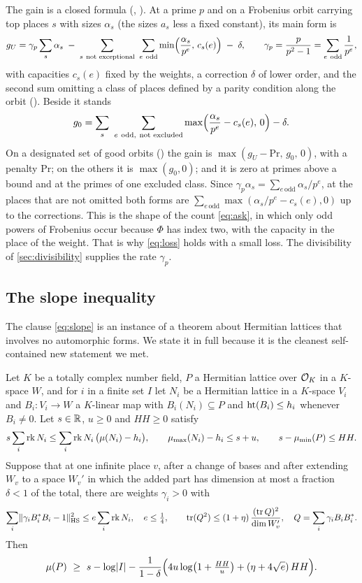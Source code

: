 The gain is a closed formula \lvS{} (, ). At a prime $p$ and on a
Frobenius orbit carrying top places $s$ with sizes $\alpha_s$ (the sizes $a_s$ less a fixed
constant), its main form is
\begin{equation}\label{eq:gU}
g_U=\gamma_p\sum_{s}\alpha_s\;-\;\sum_{s\ \text{not exceptional}}\ \sum_{e\ \mathrm{odd}}
\min\Bigl(\frac{\alpha_s}{p^{e}},\,c_s(e)\Bigr)\;-\;\delta,
\qquad \gamma_p=\frac{p}{p^2-1}=\sum_{e\ \mathrm{odd}}\frac1{p^{e}},
\end{equation}
with capacities $c_s(e)$ fixed by the weights, a correction $\delta$ of lower order, and the
second sum omitting a class of places defined by a parity condition along the orbit
(). Beside it stands
\[
g_0=\sum_{s}\ \sum_{e\ \mathrm{odd},\ \text{not excluded}}\max\Bigl(\frac{\alpha_s}{p^{e}}-c_s(e),\,0\Bigr)-\delta .
\]
On a designated set of good orbits () the gain is
$\max(g_U-\mathrm{Pr},\,g_0,\,0)$, with a penalty $\mathrm{Pr}$; on the others it is
$\max(g_0,0)$; and it is zero at primes above a bound and at the primes of one excluded class.
Since $\gamma_p\alpha_s=\sum_{e\,\mathrm{odd}}\alpha_s/p^e$, at the places that are not omitted
both forms are $\sum_{e\,\mathrm{odd}}\max(\alpha_s/p^e-c_s(e),0)$ up to the corrections. This
is the shape of the count \eqref{eq:ask}, in which only odd powers of Frobenius occur because
$\Phi$ has index two, with the capacity in the place of the weight. That is why
\eqref{eq:loss} holds with a small loss. The divisibility of \cref{sec:divisibility} supplies
the rate $\gamma_p$.

\subsection{The slope inequality}\label{sec:slope}
The clause \eqref{eq:slope} is an instance of a theorem about Hermitian lattices that involves
no automorphic forms. We state it in full because it is the cleanest self-contained new
statement we met.

\begin{statement}\label{st:F}
Let $K$ be a totally complex number field, $P$ a Hermitian lattice over $\mathcal{O}_K$ in a $K$-space
$W$, and for $i$ in a finite set $I$ let $N_i$ be a Hermitian lattice in a $K$-space $V_i$ and
$B_i\colon V_i\to W$ a $K$-linear map with $B_i(N_i)\subseteq P$ and $\operatorname{ht}(B_i)\le h_i$ whenever
$B_i\ne0$. Let $s\in\mathbb{R}$, $u\ge0$ and $HH\ge0$ satisfy
\[
s\sum_i\operatorname{rk} N_i\le\sum_i\operatorname{rk} N_i\,\bigl(\mu(N_i)-h_i\bigr),\qquad
\mu_{\max}(N_i)-h_i\le s+u,\qquad s-\mu_{\min}(P)\le HH .
\]
Suppose that at one infinite place $v$, after a change of bases and after extending $W_v$ to a
space $W_v'$ in which the added part has dimension at most a fraction $\delta<1$ of the total,
there are weights $\gamma_i>0$
with
\[
\sum_i\lVert \gamma_iB_i^*B_i-1\rVert_{\mathrm{HS}}^2\le e\sum_i\operatorname{rk} N_i,\quad e\le\tfrac14,
\qquad
\operatorname{tr}(Q^2)\le(1+\eta)\,\frac{(\operatorname{tr} Q)^2}{\dim W_v'},\quad Q=\sum_i\gamma_iB_iB_i^* .
\]
Then
\[
\mu(P)\ \ge\ s-\log\lvert I\rvert-\frac1{1-\delta}\Bigl(4u\log\bigl(1+\tfrac{HH}{u}\bigr)+(\eta+4\sqrt e)\,HH\Bigr).
\]
\end{statement}

